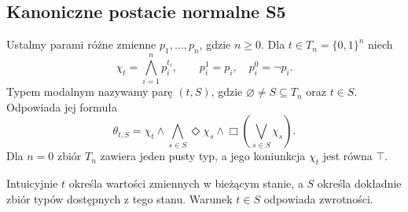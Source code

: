 \subsection{Kanoniczne postacie normalne S5}

\begin{definicja}
\label{def:ncl-modal-S5-types}
Ustalmy parami różne zmienne $p_1,\ldots,p_n$,
gdzie $n\geq0$.
Dla $t\in T_n=\{0,1\}^n$ niech
\[
 \chi_t=\bigwedge_{i=1}^{n}p_i^{t_i},
 \qquad p_i^1=p_i,\quad p_i^0=\neg p_i.
\]
Typem modalnym nazywamy parę $(t,S)$, gdzie
$\varnothing\ne S\subseteq T_n$ oraz $t\in S$.
Odpowiada jej formuła
\[
 \theta_{t,S}=\chi_t\wedge
       \bigwedge_{s\in S}\Diamond\chi_s\wedge
       \Box\left(\bigvee_{s\in S}\chi_s\right).
\]
Dla $n=0$ zbiór $T_n$ zawiera jeden pusty typ,
a jego koniunkcja $\chi_t$ jest równa $\top$.
\end{definicja}
Intuicyjnie $t$ określa wartości zmiennych
w bieżącym stanie, a $S$ określa dokładnie
zbiór typów dostępnych z tego stanu.
Warunek $t\in S$ odpowiada zwrotności.

